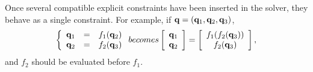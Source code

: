 Once several compatible explicit constraints have been inserted in the solver,
they behave as a single constraint. For example, if $\mathbf{q}=(\mathbf{q}_1,\mathbf{q}_2,\mathbf{q}_3)$,
$$
  \left\{\begin{array}{lcl}\mathbf{q}_1 &=& f_1(\mathbf{q}_2)\\
  \mathbf{q}_2 &=& f_2(\mathbf{q}_3)\end{array}\right. \relax{ becomes }
  \left[\begin{array}{cc}\mathbf{q}_1\\ \mathbf{q}_2\end{array}\right] =
    \left[\begin{array}{cc}f_1(f_2(\mathbf{q}_3))\\ f_2(\mathbf{q}_3)\end{array}\right],
$$
and $f_2$ should be evaluated before $f_1$.

